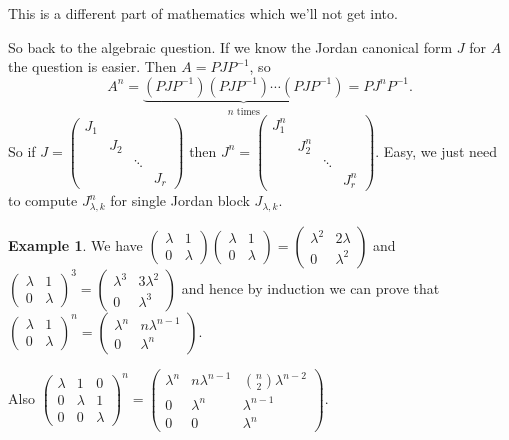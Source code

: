 \documentclass[a4paper]{article}
\theoremstyle{definition}
\newtheorem{example}[defn]{Example}
\begin{document}
This is a different part of mathematics which we'll not get into.

So back to the algebraic question. If we know the Jordan canonical form $J$ for $A$ the question is easier. Then $A=PJP^{-1}$, so
\[
A^n=\underbrace{(PJP^{-1})(PJP^{-1})\cdots (PJP^{-1})}_{n\text{ times}}=PJ^nP^{-1} .
\]
So if $J=\begin{pmatrix}J_1 & & &\\& J_2 && \\ && \ddots & \\ &&&J_r \end{pmatrix}$ then $J^n=\begin{pmatrix}J_1^n & & &\\& J_2^n && \\ && \ddots & \\ &&&J_r^n \end{pmatrix}$. Easy, we just need to compute $J_{\lambda ,k}^n$ for single Jordan block $J_{\lambda ,k}$.

\begin{example}
We have $\begin{pmatrix}\lambda & 1\\ 0&\lambda \end{pmatrix}\begin{pmatrix}\lambda & 1\\ 0&\lambda \end{pmatrix}=\begin{pmatrix}\lambda^2 & 2\lambda\\ 0&\lambda^2 \end{pmatrix}$ and $\begin{pmatrix}\lambda & 1\\ 0&\lambda \end{pmatrix}^3=\begin{pmatrix}\lambda^3 & 3\lambda^2\\ 0&\lambda^3 \end{pmatrix}$ and hence by induction we can prove that $\begin{pmatrix}\lambda & 1\\ 0&\lambda \end{pmatrix}^n=\begin{pmatrix}\lambda^n & n\lambda^{n-1}\\ 0&\lambda^n \end{pmatrix}$.

Also $\begin{pmatrix}\lambda & 1&0\\ 0&\lambda & 1\\0&0&\lambda \end{pmatrix}^n=\begin{pmatrix}\lambda^n & n\lambda^{n-1}&{n\choose 2} \lambda ^{n-2}\\ 0&\lambda^n & \lambda^{n-1}\\0&0&\lambda^n \end{pmatrix}$.
\end{example}
\end{document}

